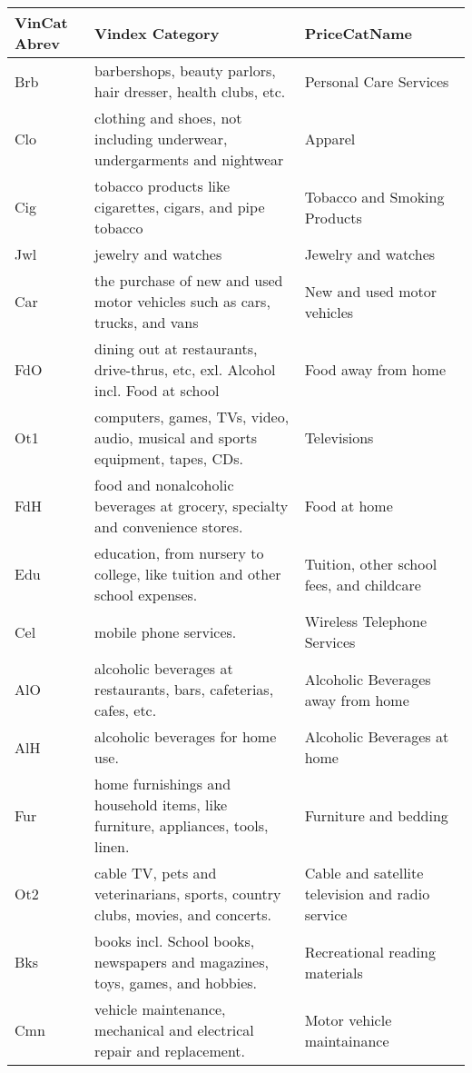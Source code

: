 \documentclass{article}
\begin{document}
\newpage
\begin{sideways}
\begin{tabular}{|l|l|l|}
\hline
VinCat Abrev & Vindex Category & PriceCatName\\ 
\hline
Brb & barbershops, beauty parlors, hair dresser, health clubs, etc. & Personal Care Services\\ 
\hline
Clo & clothing and shoes, not including underwear, undergarments and nightwear & Apparel\\ 
\hline
Cig & tobacco products like cigarettes, cigars, and pipe tobacco & Tobacco and Smoking Products\\ 
\hline
Jwl & jewelry and watches & Jewelry and watches\\ 
\hline
Car & the purchase of new and used motor vehicles such as cars, trucks, and vans & New and used motor vehicles\\ 
\hline
FdO & dining out at restaurants, drive-thrus, etc, exl. Alcohol incl. Food at school & Food away from home\\ 
\hline
Ot1 & computers, games, TVs, video, audio, musical and sports equipment, tapes, CDs. & Televisions\\ 
\hline
FdH & food and nonalcoholic beverages at grocery, specialty and convenience stores. & Food at home\\ 
\hline
Edu & education, from nursery to college, like tuition and other school expenses. & Tuition, other school fees, and childcare\\ 
\hline
Cel & mobile phone services. & Wireless Telephone Services\\ 
\hline
AlO & alcoholic beverages at restaurants, bars, cafeterias, cafes, etc. & Alcoholic Beverages away from home\\ 
\hline
AlH & alcoholic beverages for home use. & Alcoholic Beverages at home\\ 
\hline
Fur & home furnishings and household items, like furniture, appliances, tools, linen. & Furniture and bedding\\ 
\hline
Ot2 & cable TV, pets and veterinarians, sports, country clubs, movies, and concerts. & Cable and satellite television and radio service\\ 
\hline
Bks & books incl. School books, newspapers and magazines, toys, games, and hobbies. & Recreational reading materials\\ 
\hline
Cmn & vehicle maintenance, mechanical and electrical repair and replacement. & Motor vehicle maintainance\\ 

\end{tabular}
\end{sideways}
\end{document}
